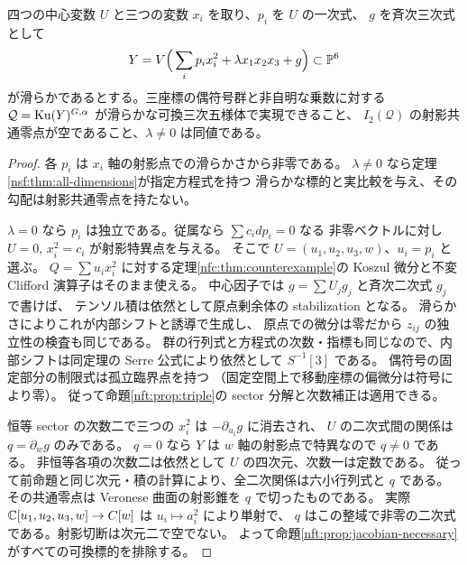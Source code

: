 \begin{corollary}[偶符号五様体の全係数での実現判定]\label{nft:cor:allsigns-five}
四つの中心変数 $U$ と三つの変数 $x_i$ を取り、$p_i$ を $U$ の一次式、
$g$ を斉次三次式として
\[
 Y=V\Big(\sum_i p_i x_i^2+\lambda x_1x_2x_3+g\Big)\subset\mathbb P^6
\]
が滑らかであるとする。三座標の偶符号群と非自明な乗数に対する
$\mathcal Q=\operatorname{Ku}(Y)^{G,\alpha}$ が滑らかな可換三次五様体で実現できること、
$I_2(\mathcal Q)$ の射影共通零点が空であること、$\lambda\ne0$ は同値である。
\end{corollary}
\begin{proof}
各 $p_i$ は $x_i$ 軸の射影点での滑らかさから非零である。
$\lambda\ne0$ なら定理\ref{nsf:thm:all-dimensions}が指定方程式を持つ
滑らかな標的と実比較を与え、その勾配は射影共通零点を持たない。

$\lambda=0$ なら $p_i$ は独立である。従属なら $\sum c_i dp_i=0$ なる
非零ベクトルに対し $U=0$, $x_i^2=c_i$ が射影特異点を与える。
そこで $U=(u_1,u_2,u_3,w)$、$u_i=p_i$ と選ぶ。
$Q=\sum u_i x_i^2$ に対する定理\ref{nfc:thm:counterexample}の
Koszul 微分と不変 Clifford 演算子はそのまま使える。
中心因子では $g=\sum U_jg_j$ と斉次二次式 $g_j$ で書けば、
テンソル積は依然として原点剰余体の stabilization となる。
滑らかさによりこれが内部シフトと誘導で生成し、
原点での微分は零だから $z_{ij}$ の独立性の検査も同じである。
群の行列式と方程式の次数・指標も同じなので、内部シフトは同定理の Serre 公式により依然として $S^{-1}[3]$ である。
偶符号の固定部分の制限式は孤立臨界点を持つ
（固定空間上で移動座標の偏微分は符号により零）。
従って命題\ref{nft:prop:triple}の sector 分解と次数補正は適用できる。

恒等 sector の次数二で三つの $x_i^2$ は $-\partial_{u_i}g$ に消去され、
$U$ の二次式間の関係は $q=\partial_w g$ のみである。
$q=0$ なら $Y$ は $w$ 軸の射影点で特異なので $q\ne0$ である。
非恒等各項の次数二は依然として $U$ の四次元、次数一は定数である。
従って前命題と同じ次元・積の計算により、全二次関係は六小行列式と $q$ である。
その共通零点は Veronese 曲面の射影錐を $q$ で切ったものである。
実際 $\mathbb C[u_1,u_2,u_3,w]\to C[w]$ は $u_i\mapsto a_i^2$ により単射で、
$q$ はこの整域で非零の二次式である。射影切断は次元二で空でない。
よって命題\ref{nft:prop:jacobian-necessary}がすべての可換標的を排除する。
\end{proof}

